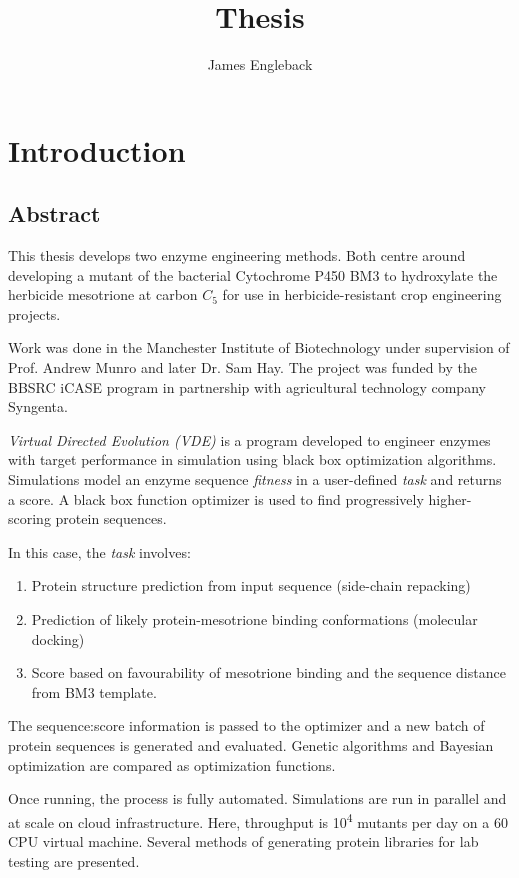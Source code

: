 \documentclass[16pt]{book}
\begin{document}
\title{\textbf{Thesis}}
\author{James Engleback}
\maketitle
\tableofcontents

\chapter{Introduction}
\section{Abstract}

This thesis develops two enzyme engineering methods.
Both centre around developing a mutant of the bacterial Cytochrome P450 BM3 to hydroxylate the herbicide mesotrione at carbon $C_5$ for use in herbicide-resistant crop engineering projects.

Work was done in the Manchester Institute of Biotechnology under supervision of Prof. Andrew Munro and later Dr. Sam Hay.
The project was funded by the BBSRC iCASE program in partnership with agricultural technology company Syngenta.

\textit{Virtual Directed Evolution (VDE)} is a program developed to engineer enzymes with target performance in simulation using black box optimization algorithms.
Simulations model an enzyme sequence \textit{fitness} in a user-defined \textit{task} and returns a score.
A black box function optimizer is used to find progressively higher-scoring protein sequences.

In this case, the \textit{task} involves:

\begin{enumerate}
	\item Protein structure prediction from input sequence (side-chain repacking)
	\item Prediction of likely protein-mesotrione binding conformations (molecular docking)
	\item Score based on favourability of mesotrione binding and the sequence distance from BM3 template.
\end{enumerate}

The sequence:score information is passed to the optimizer and a new batch of protein sequences is generated and evaluated.
Genetic algorithms and Bayesian optimization are compared as optimization functions.

Once running, the process is fully automated.
Simulations are run in parallel and at scale on cloud infrastructure.
Here, throughput is 10\textsuperscript{4} mutants per day on a 60 CPU virtual machine.
Several methods of generating protein libraries for lab testing are presented.
\end{document}
